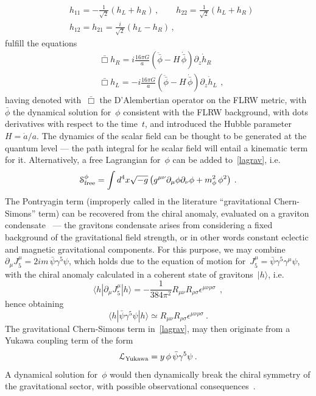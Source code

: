 \documentclass[reqno,11pt]{amsart}
\numberwithin{equation}{section}
\newcommand{\1}{\mbox{\rm 1 \hspace{-1.05 em} 1}}
\begin{document}
\begin{enumerate}[leftmargin=2em]
\begin{eqnarray}
&h_{11}= - \frac{1}{\sqrt{2}} (h_L + h_R)\,, \qquad h_{22}=  \frac{1}{\sqrt{2}} (h_L + h_R) \nonumber\\
&h_{12}=h_{21}=  \frac{i}{\sqrt{2}} (h_L - h_R) \nonumber\,,
\end{eqnarray}
fulfill the equations
\begin{eqnarray}
& \bar{\Box} h_R= i \frac{16 \pi G}{a} \left( \ddot{\bar{\phi}} -  H\, \dot{\bar{\phi}}  \right)  \partial_z \dot{h}_R \
 \nonumber\\
& \bar{\Box} h_L= - i \frac{16 \pi G}{a} \left( \ddot{\bar{\phi}} -  H\, \dot{\bar{\phi}}  \right)  \partial_z \dot{h}_L \
 \nonumber\,,
\end{eqnarray}
having denoted with~$\bar{\Box}$ the D'Alembertian operator on the FLRW metric, with~$\bar{\phi}$ the dynamical solution for~$\phi$ consistent with the FLRW background, with dots derivatives with respect to the time~$t$, and introduced the Hubble parameter~$H=\dot{a}/a$. The dynamics of the scalar field can be thought to be generated at the quantum level --- the path integral for he scalar field will entail a kinematic term for it. Alternatively, a free Lagrangian for~$\phi$ can be added to~\eqref{lagrav}, i.e.
\[ %
\mathcal{S}_{\rm free}^{\phi} = \int d^4 x \sqrt{-g} \left( g^{\mu \nu} \partial_\mu \phi \partial_\nu \phi + m^2_\phi \, \phi^2 \right)\:. \]
The Pontryagin term (improperly called in the literature ``gravitational Chern-Simons'' term) can be recovered from the chiral anomaly, evaluated on a graviton condensate~\cite{Schwartz, Fujikawa} --- the gravitons condensate arises from considering a fixed background of the gravitational field strength, or in other words constant eclectic and magnetic gravitational components.   
For this purpose, we may combine~$\partial_\mu J_5^\mu= 2 i m \,  \bar{\psi} \gamma^5 \psi$, which holds due to the equation of motion for~$J_5^\mu=\bar{\psi}  \gamma^5 \gamma^\mu \psi$, with the chiral anomaly calculated in a coherent state of gravitons~$| h\rangle$, i.e. 
\[ \langle h | \partial_\mu J_5^\mu | h \rangle = - \frac{1}{384 \pi^2}  R_{\mu \nu} R_{\rho \sigma} \epsilon^{\mu \nu \rho \sigma}\ \:, \]
hence obtaining 
\[ \langle h |   \bar{\psi} \gamma^5 \psi | h \rangle \simeq  R_{\mu \nu} R_{\rho \sigma} \epsilon^{\mu \nu \rho \sigma}\:. \]
The gravitational Chern-Simons term in~\eqref{lagrav}, may then originate from a Yukawa coupling term of the form
\[ \mathcal{L}_{\rm Yukawa} = y \, \phi\,  \bar{\psi} \gamma^5 \psi \:. \]
A dynamical solution for~$\phi$ would then dynamically break the chiral symmetry of the gravitational sector, with possible observational consequences~\cite{alexander2022chernsimons,crequesarbinowski2023parityviolating}. 


\end{enumerate}
\end{document}
